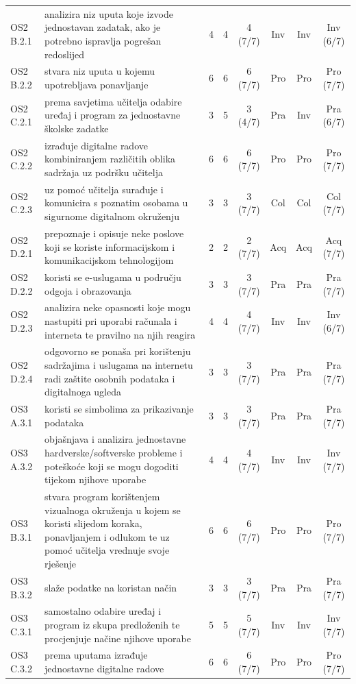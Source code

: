 \documentclass[journal,article,submit,pdftex,moreauthors]{Definitions/mdpi}
\begin{document}
{\begin{longtable}{p{1.35cm}p{6.6cm}cccccc}
OS2 B.2.1 & analizira niz uputa koje izvode jednostavan zadatak, ako je potrebno ispravlja pogrešan redoslijed & 4 & 4 & 4 (7/7) & Inv & Inv & Inv (6/7) \\
OS2 B.2.2 & stvara niz uputa u kojemu upotrebljava ponavljanje & 6 & 6 & 6 (7/7) & Pro & Pro & Pro (7/7) \\
OS2 C.2.1 & prema savjetima učitelja odabire uređaj i program za jednostavne školske zadatke & 3 & 5 & 3 (4/7) & Pra & Inv & Pra (6/7) \\
OS2 C.2.2 & izrađuje digitalne radove kombiniranjem različitih oblika sadržaja uz podršku učitelja & 6 & 6 & 6 (7/7) & Pro & Pro & Pro (7/7) \\
OS2 C.2.3 & uz pomoć učitelja surađuje i komunicira s poznatim osobama u sigurnome digitalnom okruženju & 3 & 3 & 3 (7/7) & Col & Col & Col (7/7) \\
OS2 D.2.1 & prepoznaje i opisuje neke poslove koji se koriste informacijskom i komunikacijskom tehnologijom & 2 & 2 & 2 (7/7) & Acq & Acq & Acq (7/7) \\
OS2 D.2.2 & koristi se e-uslugama u području odgoja i obrazovanja & 3 & 3 & 3 (7/7) & Pra & Pra & Pra (7/7) \\
OS2 D.2.3 & analizira neke opasnosti koje mogu nastupiti pri uporabi računala i interneta te pravilno na njih reagira & 4 & 4 & 4 (7/7) & Inv & Inv & Inv (6/7) \\
OS2 D.2.4 & odgovorno se ponaša pri korištenju sadržajima i uslugama na internetu radi zaštite osobnih podataka i digitalnoga ugleda & 3 & 3 & 3 (7/7) & Pra & Pra & Pra (7/7) \\
OS3 A.3.1 & koristi se simbolima za prikazivanje podataka & 3 & 3 & 3 (7/7) & Pra & Pra & Pra (7/7) \\
OS3 A.3.2 & objašnjava i analizira jednostavne hardverske/softverske probleme i poteškoće koji se mogu dogoditi tijekom njihove uporabe & 4 & 4 & 4 (7/7) & Inv & Inv & Inv (7/7) \\
OS3 B.3.1 & stvara program korištenjem vizualnoga okruženja u kojem se koristi slijedom koraka, ponavljanjem i odlukom te uz pomoć učitelja vrednuje svoje rješenje & 6 & 6 & 6 (7/7) & Pro & Pro & Pro (7/7) \\
OS3 B.3.2 & slaže podatke na koristan način & 3 & 3 & 3 (7/7) & Pra & Pra & Pra (7/7) \\
OS3 C.3.1 & samostalno odabire uređaj i program iz skupa predloženih te procjenjuje načine njihove uporabe & 5 & 5 & 5 (7/7) & Inv & Inv & Inv (7/7) \\
OS3 C.3.2 & prema uputama izrađuje jednostavne digitalne radove & 6 & 6 & 6 (7/7) & Pro & Pro & Pro (7/7) \\

\end{longtable}}
\end{document}

